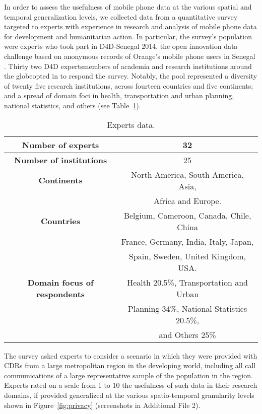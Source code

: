 \documentclass[12pt]{article}
\begin{document}
In order to assess the usefulness of mobile phone data at the various spatial and temporal generalization levels, we collected data from a  quantitative survey targeted to experts with experience in research and analysis of mobile phone data for development and humanitarian action. In  particular, the survey's population were experts who took part in D4D-Senegal 2014, the open innovation data challenge based on anonymous records of Orange's mobile phone users in Senegal \cite{de2014d4d}. Thirty two D4D experts\textemdash members of academia and research institutions around the globe\textemdash opted in to respond the survey. Notably, the pool represented a diversity of twenty five research institutions, across fourteen countries and five continents; and a spread of domain foci in health, transportation and urban planning, national statistics, and others (see Table~\ref{tab:survey-stats}).   


\begin{table}[h]
\caption{Experts data.}
\begin{center}
\begin{tabular}{@{}|c|c|@{}}
\midrule
      \textbf{Number of experts}    &   32    \\   \midrule
      \textbf{Number of institutions}   &   25  \\     \midrule
      \textbf{Continents}   &          North America, South America, Asia, \\ &  Africa and Europe.         \\      \midrule
      \textbf{Countries}   &           Belgium, Cameroon, Canada, Chile, China\\ &  France, Germany, India, Italy, Japan, \\ & Spain, Sweden, United Kingdom, USA. \\ \midrule
      \textbf{Domain focus of respondents}   &         Health 20.5\%, Transportation and Urban \\ & Planning 34\%,  National Statistics 20.5\%, \\ & and Others 25\%
\\ \bottomrule
\end{tabular}
\end{center}
\label{tab:survey-stats}
\end{table}


The survey asked experts to consider a scenario in which they were provided with CDRs from a large metropolitan region in the developing world, including all call communications of a large representative sample of the population in the region. Experts rated on a scale from 1 to 10 the usefulness of such data in their research domains, if provided generalized at the various spatio-temporal granularity levels shown in Figure~\ref{fig:privacy} (screenshots in Additional File 2). \iffalse Participation in the survey was voluntary and kept completely anonymous (survey screenshots are found in Additional File 2).\fi
\end{document}
